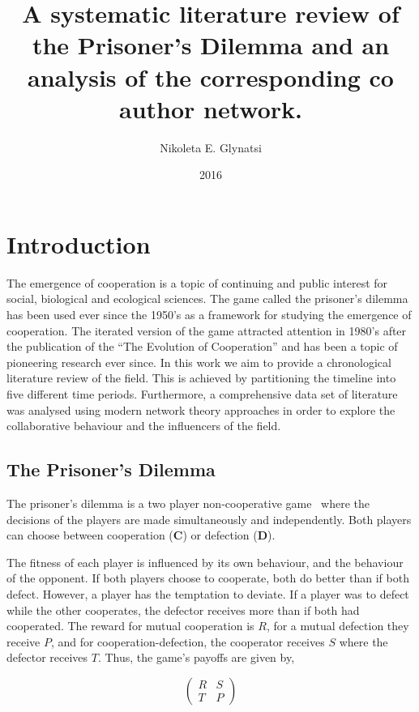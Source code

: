 \documentclass{article}
\title{A systematic literature review of the Prisoner's Dilemma and an analysis of the corresponding co author network.}
\author{Nikoleta E. Glynatsi}
\date{2016}
\theoremstyle{definition}
\begin{document}
\maketitle

\section{Introduction}\label{section:introduction}

The emergence of cooperation is a topic of continuing and public interest
for social, biological and ecological sciences. The game called the prisoner's
dilemma has been used ever since the 1950's as a framework for studying the emergence
of cooperation. The iterated version of the game attracted attention in 1980's after
the publication of the ``The Evolution of Cooperation'' and has been a topic
of pioneering research ever since. In this work we aim to provide a chronological
literature review of the field. This is achieved by partitioning the timeline into five different
time periods. Furthermore, a comprehensive data set of literature was analysed
using modern network theory approaches in order to explore the collaborative
behaviour and the influencers of the field.

\subsection{The Prisoner's Dilemma}\label{section:prisoners_dilemma}

The prisoner's dilemma is a two player non-cooperative game~\cite{Flood1958} where
the decisions of the players are made simultaneously and independently. Both players
can choose between cooperation (\textbf{C}) or defection (\textbf{D}).

The fitness of each player is influenced by its own behaviour, and the behaviour
of the opponent. If both players choose to cooperate, both do better
than if both defect. However, a player has the temptation to deviate. If a
player was to defect while the other cooperates, the defector receives
more than if both had cooperated. The reward for mutual cooperation is \(R\),
for a mutual defection they receive \(P\), and for cooperation-defection,
the cooperator receives \(S\) where the defector receives \(T\). Thus, the game's
payoffs are given by,

\begin{equation} \label{eq:the_pd_payoffs}
    \begin{pmatrix}
    R & S \\ T & P
    \end{pmatrix}
\end{equation}
\end{document}
